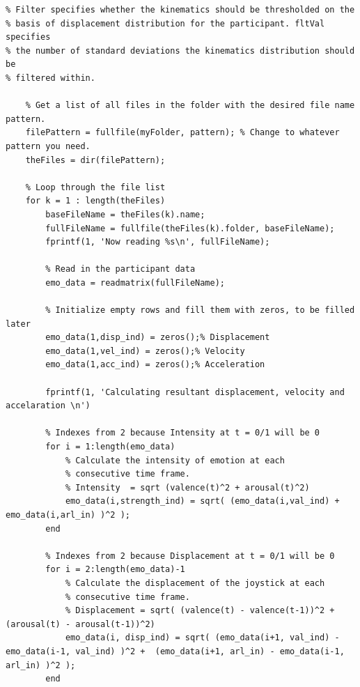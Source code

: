 \begin{lstlisting}
% Filter specifies whether the kinematics should be thresholded on the
% basis of displacement distribution for the participant. fltVal specifies
% the number of standard deviations the kinematics distribution should be
% filtered within.

    % Get a list of all files in the folder with the desired file name pattern.
    filePattern = fullfile(myFolder, pattern); % Change to whatever pattern you need.
    theFiles = dir(filePattern);
    
    % Loop through the file list
    for k = 1 : length(theFiles)
        baseFileName = theFiles(k).name;
        fullFileName = fullfile(theFiles(k).folder, baseFileName);
        fprintf(1, 'Now reading %s\n', fullFileName);
    
        % Read in the participant data
        emo_data = readmatrix(fullFileName);
        
        % Initialize empty rows and fill them with zeros, to be filled later
        emo_data(1,disp_ind) = zeros();% Displacement
        emo_data(1,vel_ind) = zeros();% Velocity
        emo_data(1,acc_ind) = zeros();% Acceleration
        
        fprintf(1, 'Calculating resultant displacement, velocity and accelaration \n')
        
        % Indexes from 2 because Intensity at t = 0/1 will be 0
        for i = 1:length(emo_data)
            % Calculate the intensity of emotion at each
            % consecutive time frame.
            % Intensity  = sqrt (valence(t)^2 + arousal(t)^2)
            emo_data(i,strength_ind) = sqrt( (emo_data(i,val_ind) + emo_data(i,arl_in) )^2 );
        end
        
        % Indexes from 2 because Displacement at t = 0/1 will be 0
        for i = 2:length(emo_data)-1
            % Calculate the displacement of the joystick at each
            % consecutive time frame.
            % Displacement = sqrt( (valence(t) - valence(t-1))^2 + (arousal(t) - arousal(t-1))^2)
            emo_data(i, disp_ind) = sqrt( (emo_data(i+1, val_ind) - emo_data(i-1, val_ind) )^2 +  (emo_data(i+1, arl_in) - emo_data(i-1, arl_in) )^2 );
        end


\end{lstlisting}
